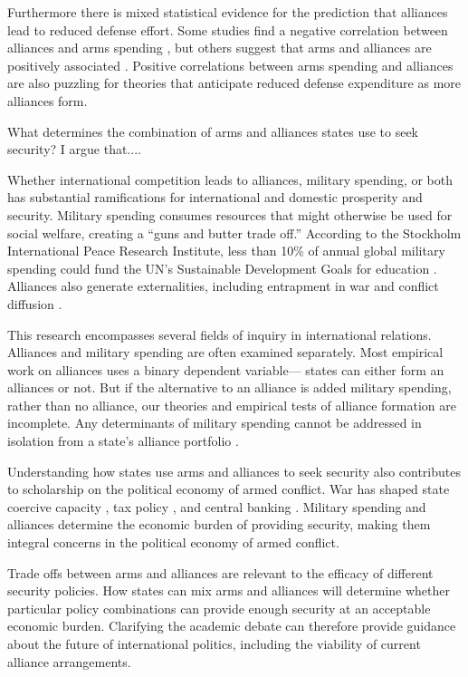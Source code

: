 \documentclass[12pt]{article}
\begin{document}
Furthermore there is mixed statistical evidence for the prediction that alliances lead to reduced defense effort. Some studies find a negative correlation between alliances and arms spending \citep{Conybeare1992, Morrow1993, Kimball2010, DigiuseppePoast2016}, but others suggest that arms and alliances are positively associated \citep{Diehl1994, Horowitzetal2017}. Positive correlations between arms spending and alliances are also puzzling for theories that anticipate reduced defense expenditure as more alliances form. 

What determines the combination of arms and alliances states use to seek security? I argue that.... 
 
Whether international competition leads to alliances, military spending, or both has substantial ramifications for international and domestic prosperity and security. Military spending consumes resources that might otherwise be used for social welfare, creating a ``guns and butter trade off.'' According to the Stockholm International Peace Research Institute, less than 10\% of annual global military spending could fund the UN's Sustainable Development Goals for education \citep{SIPRI2016}. Alliances also generate externalities, including entrapment in war \citep{Snyder1984} and conflict diffusion \citep{MelinKoch2010}. 

This research encompasses several fields of inquiry in international relations. Alliances and military spending are often examined separately. Most empirical work on alliances uses a binary dependent variable--- states can either form an alliances or not. But if the alternative to an alliance is added military spending, rather than no alliance, our theories and empirical tests of alliance formation are incomplete. Any determinants of military spending cannot be addressed in isolation from a state's alliance portfolio \citep{Nordhausetal2012}.   

Understanding how states use arms and alliances to seek security also contributes to scholarship on the political economy of armed conflict. War has shaped state coercive capacity \citep{Bean1973, Tilly1990}, tax policy \citep{Dinceccoetal2011, ScheveStasavage2012}, and central banking \citep{Poast2015}. Military spending and alliances determine the economic burden of providing security, making them integral concerns in the political economy of armed conflict.  

Trade offs between arms and alliances are relevant to the efficacy of different security policies. How states can mix arms and alliances will determine whether particular policy combinations can provide enough security at an acceptable economic burden. Clarifying the academic debate can therefore provide guidance about the future of international politics, including the viability of current alliance arrangements. 
\end{document}
